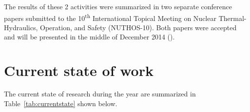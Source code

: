 \documentclass[11pt,titlepage]{article}
\begin{document}
\begin{table}[t]
\begin{minipage}[b]{.50\textwidth}
    \label{fig:fpc_regfd}
\end{minipage}
\end{table}

The results of these 2 activities were summarized in two separate conference 
papers submitted to the 10\textsuperscript{th} International Topical Meeting on 
Nuclear Thermal-Hydraulics, Operation, and Safety (NUTHOS-10). 
Both papers were accepted and will be presented in the middle of December 2014 
(\cite{Wicaksono2014d,Wicaksono2014e}).

\section{Current state of work}

The current state of research during the year are summarized in 
Table~\ref{tab:currentstate} shown below.
\end{document}

